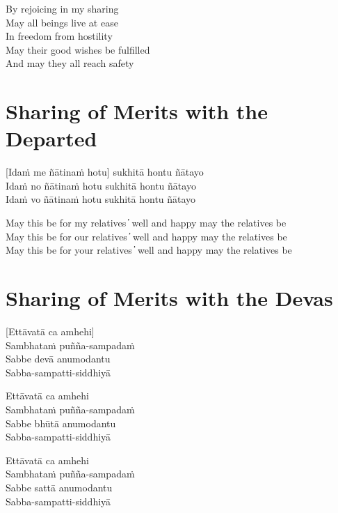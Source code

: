 \begin{cprenglish}
  By rejoicing in my sharing\\
  May all beings live at ease\\
  In freedom from hostility\\
  May their good wishes be fulfilled\\
  And may they all reach safety
\end{cprenglish}


\clearpage

\section{Sharing of Merits with the Departed}

[Idaṁ me ñātinaṁ hotu] sukhitā hontu ñātayo\\
Idaṁ no ñātinaṁ hotu sukhitā hontu ñātayo\\
Idaṁ vo ñātinaṁ hotu sukhitā hontu ñātayo

\begin{cprenglish}
  May this be for my relatives  ̓  well and happy may the relatives be\\
  May this be for our relatives  ̓  well and happy may the relatives be\\
  May this be for your relatives  ̓  well and happy may the relatives be
\end{cprenglish}


\clearpage

\section{Sharing of Merits with the Devas}

[Ettāvatā ca amhehi]\\
Sambhataṁ puñña-sampadaṁ\\
Sabbe devā anumodantu\\
Sabba-sampatti-siddhiyā

Ettāvatā ca amhehi\\
Sambhataṁ puñña-sampadaṁ\\
Sabbe bhūtā anumodantu\\
Sabba-sampatti-siddhiyā

Ettāvatā ca amhehi\\
Sambhataṁ puñña-sampadaṁ\\
Sabbe sattā anumodantu\\
Sabba-sampatti-siddhiyā

